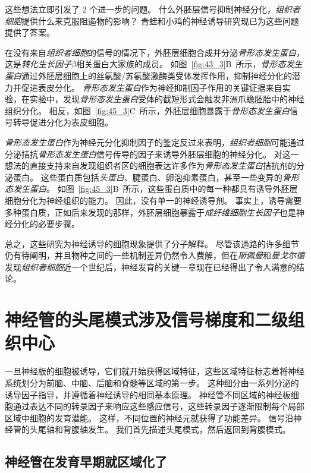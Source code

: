 这些想法立即引发了 2 个进一步的问题。
什么外胚层信号抑制神经分化，\textit{组织者细胞}提供什么来克服阻遏物的影响？
青蛙和小鸡的神经诱导研究现已为这些问题提供了答案。


在没有来自\textit{组织者细胞}的信号的情况下，外胚层细胞合成并分泌\textit{骨形态发生蛋白}，这是\textit{转化生长因子$\beta$}相关蛋白大家族的成员。
如图~\ref{fig:43_3}B~所示，\textit{骨形态发生蛋白}通过外胚层细胞上的丝氨酸/苏氨酸激酶类受体发挥作用，抑制神经分化的潜力并促进表皮分化。
\textit{骨形态发生蛋白}作为神经抑制因子作用的关键证据来自实验，在实验中，发现\textit{骨形态发生蛋白}受体的截短形式会触发非洲爪蟾胚胎中的神经组织分化。
相反，如图~\ref{fig:45_3}C~所示，外胚层细胞暴露于\textit{骨形态发生蛋白}信号转导促进分化为表皮细胞。


\textit{骨形态发生蛋白}作为神经元分化抑制因子的鉴定反过来表明，\textit{组织者细胞}可能通过分泌拮抗\textit{骨形态发生蛋白}信号传导的因子来诱导外胚层细胞的神经分化。
对这一想法的直接支持来自发现组织者区的细胞表达许多作为\textit{骨形态发生蛋白}拮抗剂的分泌蛋白。
这些蛋白质包括\textit{头蛋白}、腱蛋白、卵泡抑素蛋白，甚至一些变异的\textit{骨形态发生蛋白}。
如图~\ref{fig:45_3}B~所示，这些蛋白质中的每一种都具有诱导外胚层细胞分化为神经组织的能力。
因此，没有单一的神经诱导剂。
事实上，诱导需要多种蛋白质，正如后来发现的那样，外胚层细胞暴露于\textit{成纤维细胞生长因子}也是神经分化的必要步骤。


总之，这些研究为神经诱导的细胞现象提供了分子解释。
尽管该通路的许多细节仍有待阐明，并且物种之间的一些机制差异仍然令人费解，但在\textit{斯佩曼}和\textit{曼戈尔德}发现\textit{组织者细胞}近一个世纪后，神经发育的关键一章现在已经得出了令人满意的结论。



\section{神经管的头尾模式涉及信号梯度和二级组织中心}

一旦神经板的细胞被诱导，它们就开始获得区域特征，这些区域特征标志着将神经系统划分为前脑、中脑、后脑和脊髓等区域的第一步。
这种细分由一系列分泌的诱导因子指导，并遵循着神经诱导的相同基本原理。
神经管不同区域的神经板细胞通过表达不同的转录因子来响应这些感应信号，这些转录因子逐渐限制每个局部区域中细胞的发育潜能。
这样，不同位置的神经元就获得了功能差异。
信号沿神经管的头尾轴和背腹轴发生。
我们首先描述头尾模式，然后返回到背腹模式。



\subsection{神经管在发育早期就区域化了}

